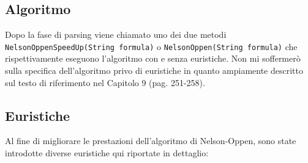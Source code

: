 \documentclass[a4paper,11pt]{article}
\begin{document}
\subsection{Algoritmo}
Dopo la fase di parsing viene chiamato uno dei due metodi {\tt NelsonOppenSpeedUp(String formula)} o {\tt NelsonOppen(String formula)} che rispettivamente eseguono l'algoritmo con e senza euristiche.
Non mi soffermerò sulla specifica dell'algoritmo privo di euristiche in quanto ampiamente descritto sul testo di riferimento nel Capitolo 9 (pag. 251-258).

\subsection{Euristiche}
Al fine di migliorare le prestazioni dell'algoritmo di Nelson-Oppen, sono state introdotte diverse euristiche qui riportate in dettaglio:
\end{document}
